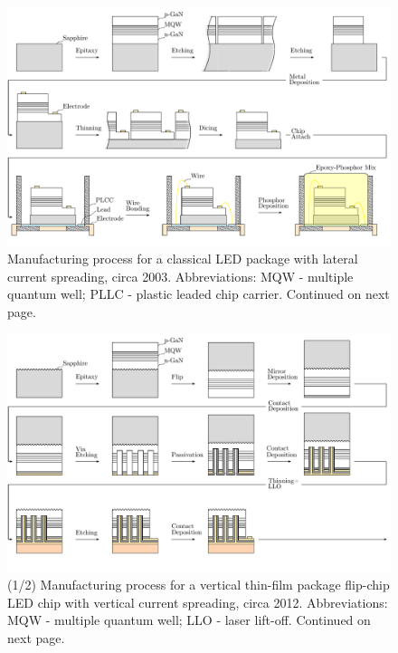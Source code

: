 \documentclass[10pt]{article}
\begin{document}
    \begin{landscape}
        \begin{figure}
            \includegraphics[width=555pt]{./figures/classical_overview_2003.pdf}
            \caption{Manufacturing process for a classical LED package with lateral current spreading, circa 2003. Abbreviations: MQW - multiple quantum well; PLLC - plastic leaded chip carrier. Continued on next page.}
            \label{fig:manuf_classical_2003}
        \end{figure}
    \end{landscape}
    

    \begin{landscape}
        \begin{figure}
            \includegraphics[width=595pt]{./figures/vtf_overview_2012-1.pdf}
            \caption{(1/2) Manufacturing process for a vertical thin-film  package flip-chip LED chip with vertical current spreading, circa 2012. Abbreviations: MQW - multiple quantum well; LLO - laser lift-off. Continued on next page.}
            \label{fig:manuf_vtf_2012-1}
        \end{figure}
    \end{landscape}
\end{document}
